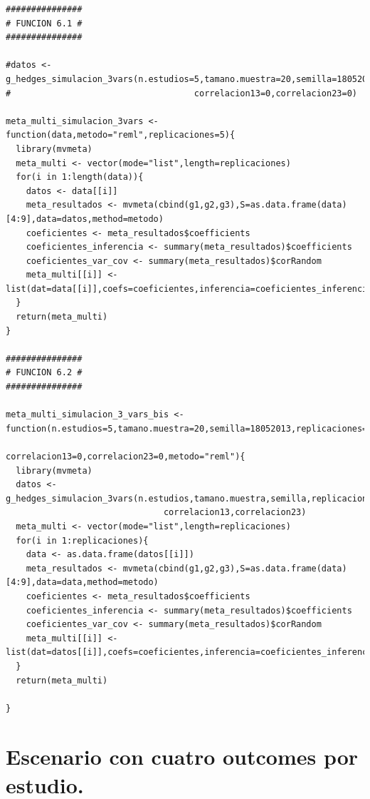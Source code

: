 \documentclass[a4paper,openright,12pt]{report}
\begin{document}
{\begin{verbatim}
###############
# FUNCION 6.1 #
###############

#datos <- g_hedges_simulacion_3vars(n.estudios=5,tamano.muestra=20,semilla=18052013,replicaciones=5,correlacion12=0,
#                                    correlacion13=0,correlacion23=0)

meta_multi_simulacion_3vars <- function(data,metodo="reml",replicaciones=5){
  library(mvmeta)
  meta_multi <- vector(mode="list",length=replicaciones)
  for(i in 1:length(data)){
    datos <- data[[i]]
    meta_resultados <- mvmeta(cbind(g1,g2,g3),S=as.data.frame(data)[4:9],data=datos,method=metodo)
    coeficientes <- meta_resultados$coefficients
    coeficientes_inferencia <- summary(meta_resultados)$coefficients
    coeficientes_var_cov <- summary(meta_resultados)$corRandom
    meta_multi[[i]] <- list(dat=data[[i]],coefs=coeficientes,inferencia=coeficientes_inferencia,var_cov=coeficientes_var_cov)
  }
  return(meta_multi)  
}

###############
# FUNCION 6.2 #
###############

meta_multi_simulacion_3_vars_bis <- function(n.estudios=5,tamano.muestra=20,semilla=18052013,replicaciones=5,correlacion12=0,
                                      correlacion13=0,correlacion23=0,metodo="reml"){
  library(mvmeta)
  datos <- g_hedges_simulacion_3vars(n.estudios,tamano.muestra,semilla,replicaciones,correlacion12,
                               correlacion13,correlacion23)
  meta_multi <- vector(mode="list",length=replicaciones)
  for(i in 1:replicaciones){
    data <- as.data.frame(datos[[i]])
    meta_resultados <- mvmeta(cbind(g1,g2,g3),S=as.data.frame(data)[4:9],data=data,method=metodo)
    coeficientes <- meta_resultados$coefficients
    coeficientes_inferencia <- summary(meta_resultados)$coefficients
    coeficientes_var_cov <- summary(meta_resultados)$corRandom
    meta_multi[[i]] <- list(dat=datos[[i]],coefs=coeficientes,inferencia=coeficientes_inferencia,var_cov=coeficientes_var_cov)
  }
  return(meta_multi)  
  
}
\end{verbatim}}

\section{Escenario con cuatro outcomes por estudio.}
\end{document}
